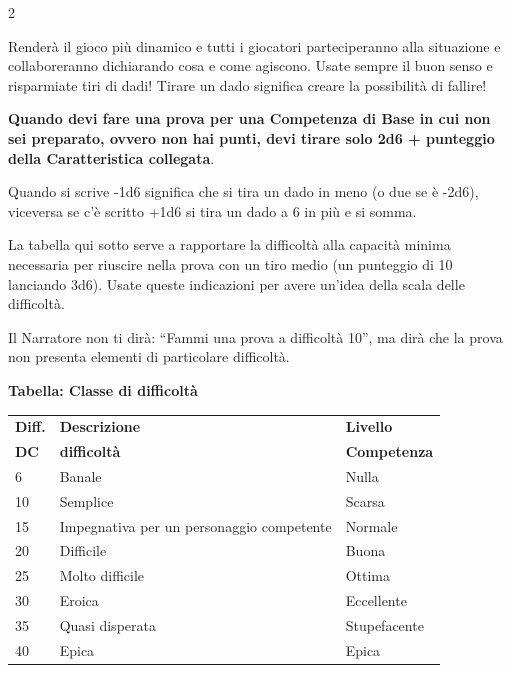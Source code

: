 \begin{multicols}{2}
\begin{narratore}
Renderà il gioco più dinamico e tutti i giocatori parteciperanno alla situazione e collaboreranno dichiarando cosa e come agiscono. Usate sempre il buon senso e risparmiate tiri di dadi! Tirare un dado significa creare la possibilità di fallire!
\end{narratore}

%

\medskip

\textbf{Quando devi fare una prova per una Competenza di Base in cui non sei preparato, ovvero non hai punti, devi tirare solo 2d6 + punteggio della Caratteristica collegata}.

Quando si scrive -1d6 significa che si tira un dado in meno (o due se è -2d6), viceversa se c'è scritto +1d6 si tira un dado a 6 in più e si somma.

La tabella qui sotto serve a rapportare la difficoltà alla capacità minima necessaria per riuscire nella prova con un tiro medio (un punteggio di 10 lanciando 3d6). Usate queste indicazioni per avere un'idea della scala delle difficoltà.

Il Narratore non ti dirà: ``Fammi una prova a difficoltà 10'', ma dirà che la prova non presenta elementi di particolare difficoltà.

%

\medskip

\textbf{Tabella: Classe di difficoltà}\label{basedifficolta}

\medskip

\noindent\begin{tabularx}{\linewidth}{lXl}
	\toprule
\rowcolor{gray!20}\textbf{Diff.} & \textbf{Descrizione} & \textbf{Livello}\\
\textbf{DC}&\textbf{difficoltà}& \textbf{Competenza}\\
\toprule
\rowcolor{gray!20}6 & Banale & Nulla\\
10 & Semplice & Scarsa\\
\rowcolor{gray!20}15 & Impegnativa per un personaggio competente & Normale\\
20 & Difficile & Buona\\
\rowcolor{gray!20}25 & Molto difficile & Ottima\\
30 & Eroica & Eccellente\\
\rowcolor{gray!20}35 & Quasi disperata & Stupefacente\\
40 & Epica & Epica
\end{tabularx}


\end{multicols}
